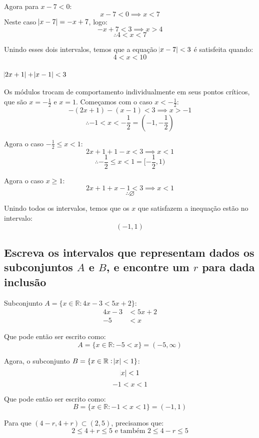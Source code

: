 \documentclass[12pt]{article}
\begin{document}
\smallskip

Agora para \(x-7 < 0\):
\[
	x-7 < 0 \implies x < 7
\]
Neste caso \(\abs{x-7} = -x+7\), logo:
\[
	-x+7 < 3 \implies x > 4
\]
\[
	\therefore 4 < x < 7
\]

Unindo esses dois intervalos, temos que a equação \(\abs{x-7} < 3\) é satisfeita quando:
\[
	\boxed{
		4 < x < 10
	}
\]

\subsubsection{\( \abs{2x+1}+\abs{x-1}<3 \)}
Os módulos trocam de comportamento individualmente em seus pontos críticos, que são \(x=-\frac{1}{2}\) e \(x=1\). Começamos com o caso \(x < -\frac{1}{2}\):
\[
	-(2x+1) - (x-1) < 3 \implies x > -1
\]
\[
	\therefore -1 < x < -\frac{1}{2} = (-1,-\frac{1}{2})
\]

Agora o caso \(-\frac{1}{2} \leq x < 1\):
\[
	2x+1 + 1 - x< 3 \implies x < 1
\]
\[
	\therefore -\frac{1}{2} \leq x < 1 = [-\frac{1}{2},1)
\]

Agora o caso \(x \geq 1 \):
\[
	2x+1 + x-1 < 3 \implies x < 1
\]
\[
	\therefore \varnothing
\]

Unindo todos os intervalos, temos que os \(x\) que satisfazem a inequação estão no intervalo:
\[
	\boxed{
		(-1,1)
	}
\]
\subsection{Escreva os intervalos que representam dados os subconjuntos \(A\) e \(B\), e encontre um \(r\) para dada inclusão}
Subconjunto \(A = \{x \in \mathbb{R} : 4x-3<5x+2\}\):
\begin{align*}
	4x-3 &< 5x+2 \\
	-5 &< x
\end{align*}

Que pode então ser escrito como:
\[
	\boxed{
		A = \{x \in \mathbb{R} : -5 < x\} = (-5,\infty)
	}
\]

\bigskip \bigskip

Agora, o subconjunto \(B = \{x \in \mathbb{R} : \abs{x}<1\} \):
\[
	\abs{x} < 1
\]
\[
	-1 < x < 1
\]

Que pode então ser escrito como:
\[ 
	\boxed{
		B = \{x\in\mathbb{R} : -1 < x < 1\} = (-1,1)
	}
\]

\bigskip \bigskip \bigskip

Para que \( (4-r,4+r) \subset (2,5) \), precisamos que:
\[ 2 \leq 4 + r \leq 5 \text{ e também } 2 \leq 4 - r \leq 5 \]
\end{document}
